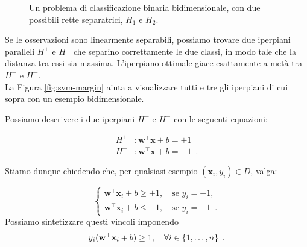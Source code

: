 \begin{figure}[ht]
    \centering
    \caption{Un problema di classificazione binaria bidimensionale, con due possibili rette separatrici, $H_1$ e $H_2$.}
    \label{fig:hyperplanes}
\end{figure}

Se le osservazioni sono linearmente separabili, possiamo trovare due iperpiani paralleli $H^+$ e $H^-$ che separino correttamente le due classi, in modo tale che la distanza tra essi sia massima. L'iperpiano ottimale giace esattamente a metà tra $H^+$ e $H^-$. \\
La Figura \ref{fig:svm-margin} aiuta a visualizzare tutti e tre gli iperpiani di cui sopra con un esempio bidimensionale.

Possiamo descrivere i due iperpiani $H^+$ e $H^-$ con le seguenti equazioni: 

\begin{equation}
    \begin{aligned}
        H^+ &: \mathbf{w}^{\top} \mathbf{x}+b=+1 \\
        H^- &: \mathbf{w}^{\top} \mathbf{x}+b=-1 \enspace .
    \end{aligned}
\end{equation}

Stiamo dunque chiedendo che, per qualsiasi esempio $(\mathbf{x}_i, y_i) \in D$, valga:

\begin{equation}
    \begin{cases}
        \mathbf{w}^{\top} \mathbf{x}_i +b \geq +1, \quad \text{se } y_i=+1, \\
        \mathbf{w}^{\top} \mathbf{x}_i +b \leq -1, \quad \text{se }y_i=-1 \enspace .
    \end{cases}
\end{equation}
Possiamo sintetizzare questi vincoli imponendo
\begin{equation}
    y_i(\mathbf{w}^{\top} \mathbf{x}_i +b) \geq 1, \quad \forall \space i \in \{1, \dots, n\} \enspace .
\end{equation}

